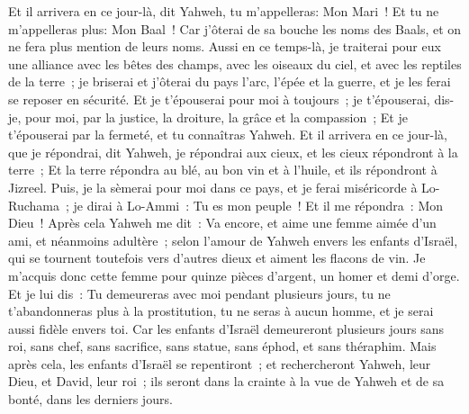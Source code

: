 \begin{multicols}{2}
 Et il arrivera en ce jour-là, dit Yahweh, tu m'appelleras: Mon Mari~! Et tu ne m'appelleras plus: Mon Baal~!
Car j'ôterai de sa bouche les noms des Baals, et on ne fera plus mention de leurs noms.
Aussi en ce temps-là, je traiterai pour eux une alliance avec les bêtes des champs, avec les oiseaux du ciel, et avec les reptiles de la terre~; je briserai et j'ôterai du pays l'arc, l'épée et la guerre, et je les ferai se reposer en sécurité.
Et je t'épouserai pour moi à toujours~; je t'épouserai, dis-je, pour moi, par la justice, la droiture, la grâce et la compassion~;
Et je t'épouserai par la fermeté, et tu connaîtras Yahweh.
Et il arrivera en ce jour-là, que je répondrai, dit Yahweh, je répondrai aux cieux, et les cieux répondront à la terre~;
Et la terre répondra au blé, au bon vin et à l'huile, et ils répondront à Jizreel. 
Puis, je la sèmerai pour moi dans ce pays, et je ferai miséricorde à Lo-Ruchama~; je dirai à Lo-Ammi~: Tu es mon peuple~! Et il me répondra~: Mon Dieu~!
\VerseOne{}Après cela Yahweh me dit~: Va encore, et aime une femme aimée d'un ami, et néanmoins adultère~; selon l'amour de Yahweh envers les enfants d'Israël, qui se tournent toutefois vers d'autres dieux et aiment les flacons de vin.
Je m'acquis donc cette femme pour quinze pièces d'argent, un homer et demi d'orge.
Et je lui dis~: Tu demeureras avec moi pendant plusieurs jours, tu ne t'abandonneras plus à la prostitution, tu ne seras à aucun homme, et je serai aussi fidèle envers toi.
Car les enfants d'Israël demeureront plusieurs jours sans roi, sans chef, sans sacrifice, sans statue, sans éphod, et sans théraphim.
Mais après cela, les enfants d'Israël se repentiront~; et rechercheront Yahweh, leur Dieu, et David, leur roi~; ils seront dans la crainte à la vue de Yahweh et de sa bonté, dans les derniers jours.

\end{multicols}
